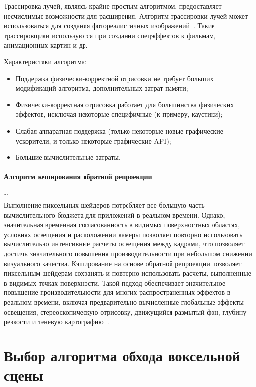 Трассировка лучей, являясь крайне простым алгоритмом, предоставляет несчислимые возможности для 
расширения. Алгоритм трассировки лучей может использоваться для создания фотореалистичных
изображений~\cite{PBRT3e}. Такие трассировщики используются при создании спецэффектов к фильмам, 
анимационных картин и др. 

Характеристики алгоритма:
\begin{itemize}[label*=---]
    \item Поддержка физически-корректной отрисовки не требует больших модификаций алгоритма,
        дополнительных затрат памяти;
    \item Физически-корректная отрисовка работает для большинства физических эффектов,
        исключая некоторые специфичные (к примеру, каустики);
    \item Слабая аппаратная поддержка (только некоторые новые графические ускорители, и только 
        некоторые графические API);
    \item Большие вычислительные затраты.
\end{itemize}

\paragraph{Алгоритм кеширования обратной репроекции}""\\
Выполнение пиксельных шейдеров потребляет все большую часть вычислительного бюджета для приложений в 
реальном времени. Однако, значительная временная согласованность в видимых поверхностных областях, 
условиях освещения и расположении камеры позволяет повторно использовать вычислительно интенсивные 
расчеты освещения между кадрами, что позволяет достичь значительного повышения производительности 
при небольшом снижении визуального качества. 
Кэширование на основе обратной репроекции позволяет пиксельным шейдерам сохранять и повторно использовать 
расчеты, выполненные в видимых точках поверхности. 
Такой подход обеспечивает значительное повышение производительности для многих распространенных 
эффектов в реальном времени, включая предварительно вычисленные глобальные эффекты освещения, 
стереоскопическую отрисовку, движущийся размытый фон, глубину резкости и теневую картографию~\cite{ARTSwRPC}.

\section{Выбор алгоритма обхода воксельной сцены}

